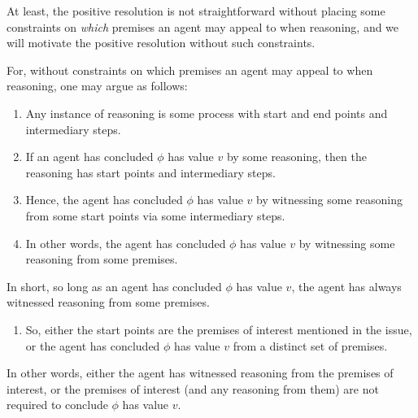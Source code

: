 \begin{note}
  At least, the positive resolution is not straightforward without placing some constraints on \emph{which} premises an agent may appeal to when reasoning, and we will motivate the positive resolution without such constraints.

  For, without constraints on which premises an agent may appeal to when reasoning, one may argue as follows:
  \begin{enumerate}
  \item
    Any instance of reasoning is some process with start and end points and intermediary steps.
  \item
    If an agent has concluded \(\phi\) has value \(v\) by some reasoning, then the reasoning has start points and intermediary steps.
  \item
    Hence, the agent has concluded \(\phi\) has value \(v\) by witnessing some reasoning from some start points via some intermediary steps.
  \item
    In other words, the agent has concluded \(\phi\) has value \(v\) by witnessing some reasoning from some premises.
  \end{enumerate}

  In short, so long as an agent has concluded \(\phi\) has value \(v\), the agent has always witnessed reasoning from some premises.

  \begin{enumerate}[resume]
  \item
    So, either the start points are the premises of interest mentioned in the issue, or the agent has concluded \(\phi\) has value \(v\) from a distinct set of premises.
  \end{enumerate}

  In other words, either the agent has witnessed reasoning from the premises of interest, or the premises of interest (and any reasoning from them) are not required to conclude \(\phi\) has value \(v\).
\end{note}

